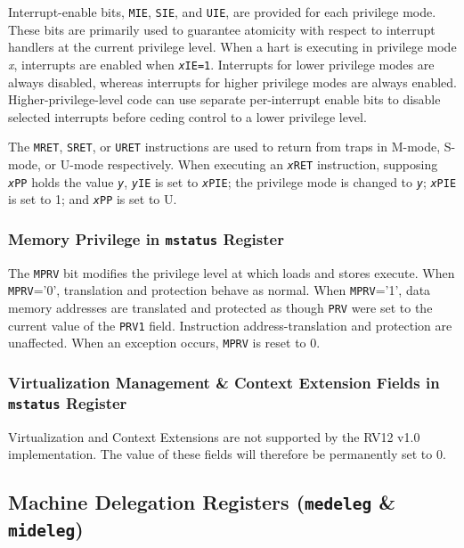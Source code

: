 Interrupt-enable bits, \texttt{MIE}, \texttt{SIE}, and \texttt{UIE}, are provided for each
privilege mode. These bits are primarily used to guarantee atomicity
with respect to interrupt handlers at the current privilege level. When
a hart is executing in privilege mode \emph{x}, interrupts are enabled
when \texttt{\emph{x}IE=1}. Interrupts for lower privilege modes are always
disabled, whereas interrupts for higher privilege modes are always
enabled. Higher-privilege-level code can use separate per-interrupt
enable bits to disable selected interrupts before ceding control to a
lower privilege level.



The \texttt{MRET}, \texttt{SRET}, or \texttt{URET} instructions are used to return from traps in M-mode, S-mode, or U-mode respectively. When executing an \texttt{\emph{x}RET}
instruction, supposing \texttt{\emph{x}PP} holds the value \texttt{\emph{y}}, \texttt{\emph{y}IE}
is set to \texttt{\emph{x}PIE}; the privilege mode is changed to \texttt{\emph{y}};
\texttt{\emph{x}PIE} is set to 1; and \texttt{\emph{x}PP} is set to U.

\subsubsection{Memory Privilege in \texttt{mstatus} Register
}\label{memory-privilege-in-mstatus-register}

The \texttt{MPRV} bit modifies the privilege level at which loads and stores
execute. When \texttt{MPRV}='0', translation and protection behave as normal.
When \texttt{MPRV}='1', data memory addresses are translated and protected as
though \texttt{PRV} were set to the current value of the \texttt{PRV1} field. Instruction
address-translation and protection are unaffected. When an exception
occurs, \texttt{MPRV} is reset to 0.

\subsubsection{Virtualization Management \& Context Extension Fields in
\texttt{mstatus} Register
}\label{virtualization-management-context-extension-fields-in-mstatus-register}

Virtualization and Context Extensions are not supported by the RV12 v1.0
implementation. The value of these fields will therefore be permanently
set to 0.

\subsection{Machine Delegation Registers
(\texttt{medeleg} \& \texttt{mideleg})} \label{machine-exception-interrupt-delegation-registers-medeleg-mideleg}

